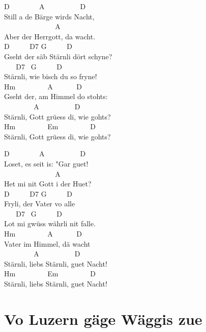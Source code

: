 \documentclass[
  letterpaper,
  twoside=false]{scrbook}
\begin{document}
D ~ ~ ~ ~ ~A ~ ~ ~ ~ ~ ~D\\
Still a de Bärge wird\textquotesingle s Nacht,\\
\hspace*{0.333em} ~ ~ ~ ~ ~ ~ ~ ~ ~A\\
Aber der Herrgott, da wacht.\\
D ~ ~ ~ D7 G ~ ~ ~ D\\
Gseht der säb Stärnli dört schyne?\\
\hspace*{0.333em} ~ ~ D7 ~G ~ ~ ~ D\\
Stärnli, wie bisch du so fryne!\\
Hm ~ ~ ~ ~ ~ A ~ ~ ~ ~D\\
Gseht der, am Himmel do stoht\textquotesingle s:\\
\hspace*{0.333em} ~ ~ ~ ~ ~ A ~ ~ ~ ~ ~ ~D\\
Stärnli, Gott grüess di, wie goht\textquotesingle s?\\
Hm ~ ~ ~ ~ ~ Em ~ ~ ~ ~ ~ D\\
Stärnli, Gott grüess di, wie goht\textquotesingle s?

D ~ ~ ~ ~ ~A ~ ~ ~ ~ ~ ~D\\
Loset, es seit is: "Gar guet!\\
\hspace*{0.333em} ~ ~ ~ ~ ~ ~ ~ ~ ~A\\
Het mi nit Gott i der Huet?\\
D ~ ~ ~ D7 G ~ ~ ~ D\\
Fryli, der Vater vo alle\\
\hspace*{0.333em} ~ ~ D7 ~G ~ ~ ~ D\\
Lot mi gwüss währli nit falle.\\
Hm ~ ~ ~ ~ ~ A ~ ~ ~ ~D\\
Vater im Himmel, dä wacht\\
\hspace*{0.333em} ~ ~ ~ ~ ~ A ~ ~ ~ ~ ~ ~D\\
Stärnli, liebs Stärnli, guet Nacht!\\
Hm ~ ~ ~ ~ ~ Em ~ ~ ~ ~ ~ D\\
Stärnli, liebs Stärnli, guet Nacht!

\hypertarget{vo-luzern-guxe4ge-wuxe4ggis-zue}{%
\chapter{Vo Luzern gäge Wäggis
zue}\label{vo-luzern-guxe4ge-wuxe4ggis-zue}}
\end{document}
